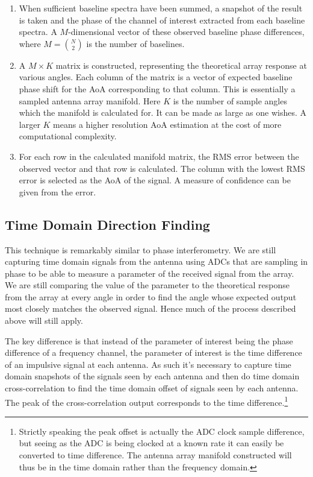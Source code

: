 \begin{enumerate}
  \item When sufficient baseline spectra have been summed, a snapshot of the result is taken and the phase of the channel of interest extracted from each baseline spectra. A \(M\)-dimensional vector of these observed baseline phase differences, where \(M = {N \choose 2}\) is the number of baselines.
  \item A \(M \times K\) matrix is constructed, representing the theoretical array response at various angles. Each column of the matrix is a vector of expected baseline phase shift for the AoA corresponding to that column. This is essentially a sampled antenna array manifold. Here \(K\) is the number of sample angles which the manifold is calculated for. It can be made as large as one wishes. A larger \(K\) means a higher resolution AoA estimation at the cost of more computational complexity.
  \item For each row in the calculated manifold matrix, the RMS error between the observed vector and that row is calculated. The column with the lowest RMS error is selected as the AoA of the signal. A measure of confidence can be given from the error.
\end{enumerate}

\subsection{Time Domain Direction Finding}
This technique is remarkably similar to phase interferometry. We are still capturing time domain signals from the antenna using ADCs that are sampling in phase to be able to measure a parameter of the received signal from the array. We are still comparing the value of the parameter to the theoretical response from the array at every angle in order to find the angle whose expected output most closely matches the observed signal. Hence much of the process described above will still apply.

The key difference is that instead of the parameter of interest being the phase difference of a frequency channel, the parameter of interest is the time difference of an impulsive signal at each antenna. As such it's necessary to capture time domain snapshots of the signals seen by each antenna and then do time domain cross-correlation to find the time domain offset of signals seen by each antenna. The peak of the cross-correlation output corresponds to the time difference.\footnote{Strictly speaking the peak offset is actually the ADC clock sample difference, but seeing as the ADC is being clocked at a known rate it can easily be converted to time difference. The antenna array manifold constructed will thus be in the time domain rather than the frequency domain.}

